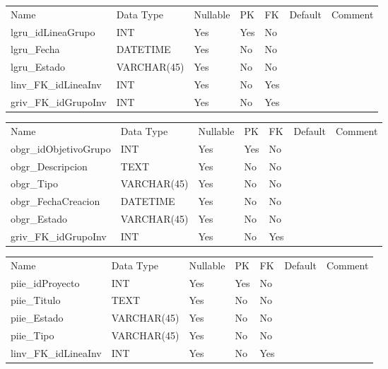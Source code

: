 			\begin{center}
				\begin{tabular}{ |l|l|l|l|l|l|l| }
					\hline
					Name & Data Type & Nullable & PK & FK & Default & Comment \\
					lgru_idLineaGrupo & INT & Yes & Yes & No &  & \\ \hline 
lgru_Fecha & DATETIME & Yes & No & No &  & \\ \hline 
lgru_Estado & VARCHAR(45) & Yes & No & No &  & \\ \hline 
linv_FK_idLineaInv & INT & Yes & No & Yes &  & \\ \hline 
griv_FK_idGrupoInv & INT & Yes & No & Yes &  & \\ \hline 

				\end{tabular}
			\end{center}
		

			\begin{center}
				\begin{tabular}{ |l|l|l|l|l|l|l| }
					\hline
					Name & Data Type & Nullable & PK & FK & Default & Comment \\
					obgr_idObjetivoGrupo & INT & Yes & Yes & No &  & \\ \hline 
obgr_Descripcion & TEXT & Yes & No & No &  & \\ \hline 
obgr_Tipo & VARCHAR(45) & Yes & No & No &  & \\ \hline 
obgr_FechaCreacion & DATETIME & Yes & No & No &  & \\ \hline 
obgr_Estado & VARCHAR(45) & Yes & No & No &  & \\ \hline 
griv_FK_idGrupoInv & INT & Yes & No & Yes &  & \\ \hline 

				\end{tabular}
			\end{center}
		

			\begin{center}
				\begin{tabular}{ |l|l|l|l|l|l|l| }
					\hline
					Name & Data Type & Nullable & PK & FK & Default & Comment \\
					piie_idProyecto & INT & Yes & Yes & No &  & \\ \hline 
piie_Titulo & TEXT & Yes & No & No &  & \\ \hline 
piie_Estado & VARCHAR(45) & Yes & No & No &  & \\ \hline 
piie_Tipo & VARCHAR(45) & Yes & No & No &  & \\ \hline 
linv_FK_idLineaInv & INT & Yes & No & Yes &  & \\ \hline 

				\end{tabular}
			\end{center}
		

